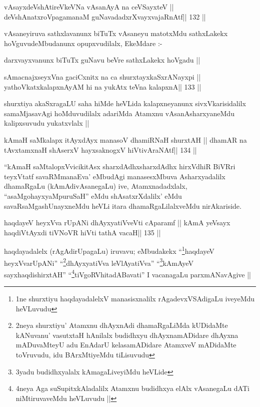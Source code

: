 \begin{shl}
vAsayxdeVshAtireVkeVNa vAsanAyA na ceVSayxteV ||
deVshAnatxroVpagamanaM guNavadadxrXvayxvajaRnAtf\hfill || 132 ||
\end{shl}

\begin{artha}
vAsaneyiruva sathxlavanunx biTuTx vAsaneyu matotxMdu sathxLakekx
hoVguvudeMbudanunx opupxvudilalx, EkeMdare :-

darxvayxvanunx biTuTx guNavu beVre sathxLakekx hoVgadu ||
\end{artha}

\begin{shl}
sAmacnajxseyxVna gaciCxnitx na ca shurxtayxkaSxrANayxpi ||
yathoVkatxkalapxnAyAM hi na yukAtx teVna kalapxnA\hfill || 133 ||
\end{shl}

\begin{artha}
shurxtiya akaSxragaLU saha hiMde heVLida kalapxneyanunx
sivxVkarisidalilx samaMjasavAgi hoMduvudilalx adariMda Atamxnu
vAsanAsharxyaneMdu kalipxsuvudu yukatxvlalx ||
\end{artha}

\begin{shl}
kAmaH saMkalapx itAyxdAyx manasoV dhamiRNaH shurxtAH ||
dhamAR na tAvxtamxnaH shAserxV hayxsaknogxV hiVtivAraNAtf\hfill || 134 ||
\end{shl}

\begin{artha}
``kAmaH saMtalopxVvicikitAsx sharxdAdhx\s sharxdAdhx hirxVdhiR BiVRri
  teyxVtatf savaRMmanaEva' eMbudAgi manasesxMbuva Asharxyadalilx
  dhamaRgaLu (kAmAdivAsanegaLu) ive, Atamxnadadxlalx,
  ``asaMgohayxyaMpuruSaH'' eMdu shAsatxrXdalilx' eMdu
  savaRsaMgashUnayxneMdu heVLi itara dhamaRgaLilalxveMdu nirAkariside.
\end{artha}

\begin{shl}
haqdayeV heyxVva rUpANi dhAyxyatiVveVti cAparamf ||
kAmA yeV\s sayx haqdiVtAyxdi tiVNoVR hiVti tathA vacaH\hfill || 135 ||
\end{shl}

\begin{artha}
haqdayadalelx (rAgAdirUpagaLu) iruvavu;
eMbudakekx ``\footnote[1]{1ne shurxtiyu haqdayadalelxV manasisxnalilx
  rAgadevxVSAdigaLu iveyeMdu heVLuvudu}haqdayeV heyxVvarUpANi''
``\footnote[2]{2neya shurxtiyu' Atamxnu dhAyxnAdi dhamaRgaLiMda
  kUDidaMte kANuvanu' vasutxtaH hAnilalx budidhxyu dhAyxnamADidare
  dhAyxna mADuvaMteyU adu EnAdarU kelasamADidare AtamxveV mADidaMte
  toVruvudu, idu BArxMtiyeMdu tiLisuvudu}dhAyxyatiVva leVlAyatiVva''
``\footnote[3]{3yadu budidhxyalalx kAmagaLiveyiMdu heVLide}kAmAyeV\s
sayxhaqdishirxtAH'' ``\footnote[4]{4neya Aga suSupitxkAladalilx
  Atamxnu budidhxya elAlx vAsanegaLu dATi niMtiruvaveMdu heVLuvudu ||}tiVgoRVhitadABavati'' I vacanagaLu
parxmANavAgive ||
\end{artha}

